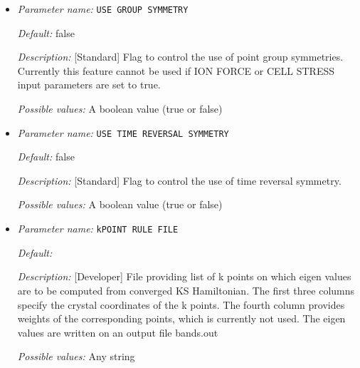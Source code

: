 \begin{itemize}
\item {\it Parameter name:} {\tt USE GROUP SYMMETRY}
\label{parameters:Brillouin zone k point sampling options/USE GROUP SYMMETRY}
\label{parameters:Brillouin_20zone_20k_20point_20sampling_20options/USE_20GROUP_20SYMMETRY}




{\it Default:} false


{\it Description:} [Standard] Flag to control the use of point group symmetries. Currently this feature cannot be used if ION FORCE or CELL STRESS input parameters are set to true.


{\it Possible values:} A boolean value (true or false)
\item {\it Parameter name:} {\tt USE TIME REVERSAL SYMMETRY}
\label{parameters:Brillouin zone k point sampling options/USE TIME REVERSAL SYMMETRY}
\label{parameters:Brillouin_20zone_20k_20point_20sampling_20options/USE_20TIME_20REVERSAL_20SYMMETRY}




{\it Default:} false


{\it Description:} [Standard] Flag to control the use of time reversal symmetry.


{\it Possible values:} A boolean value (true or false)
\item {\it Parameter name:} {\tt kPOINT RULE FILE}
\label{parameters:Brillouin zone k point sampling options/kPOINT RULE FILE}
\label{parameters:Brillouin_20zone_20k_20point_20sampling_20options/kPOINT_20RULE_20FILE}




{\it Default:} 


{\it Description:} [Developer] File providing list of k points on which eigen values are to be computed from converged KS Hamiltonian. The first three columns specify the crystal coordinates of the k points. The fourth column provides weights of the corresponding points, which is currently not used. The eigen values are written on an output file bands.out


{\it Possible values:} Any string
\end{itemize}



